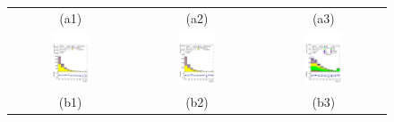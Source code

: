 \begin{figure}[H]
\begin{tabular}{@{}ccc@{}}
(a1) & (a2) & (a3) \\
\includegraphics[page=1,width=0.33\textwidth]{figures/new_pt/reg1l1tau1b2j_os.pdf}&
\includegraphics[page=1,width=0.33\textwidth]{figures/new_pt/reg1l1tau1b3j_os.pdf}&
\includegraphics[page=1,width=0.33\textwidth]{figures/new_pt/reg2mtau1b2jos_vetobtagwp70_highmet.pdf}\\
(b1) & (b2) & (b3) \\

\end{tabular}
\end{figure}
